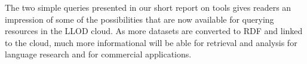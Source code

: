 The two simple queries presented in our short report on tools gives readers an impression of some of the possibilities that are now available for querying resources in the LLOD cloud. As more datasets are converted to RDF and linked to the cloud, much more informational will be able for retrieval and analysis for language research and for commercial applications.
